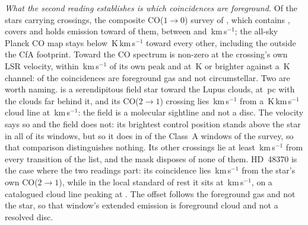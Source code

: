 \emph{What the second reading establishes is which coincidences are
foreground.} Of the \LsNLos{} stars carrying crossings, the composite
CO($1\to0$) survey of \citet{DameThaddeus2022}, which contains
\citet{Dame2001}, covers \LsNLosCov{} and holds emission toward \LsNLosDet{}
of them, between \LsCoVLo{} and \LsCoVHi\,km\,s$^{-1}$; the all-sky Planck CO
map \citep{PlanckCO2016} stays below \LsPlanckMax\,K\,km\,s$^{-1}$ toward
every other, including the \LsNLosOut{} outside the CfA footprint. Toward
\LsCloudStars{} the CO spectrum is non-zero at the crossing's own LSR
velocity, within \LsCloudDvMax\,km\,s$^{-1}$ of its own peak and at
\LsCloudTMin\,K or brighter against a \LsCoRms\,K channel: \LsNCloud{} of the
\MkNCoinc{} coincidences are foreground gas and not circumstellar.
Two are worth naming. \BkAlmaName{} is a serendipitous field star toward the
Lupus clouds, at \BkAlmaDistPc\,pc with the clouds far behind it, and its
CO($2\to1$) crossing lies \LsLupDv\,km\,s$^{-1}$ from a
\LsLupWco\,K\,km\,s$^{-1}$ cloud line at \LsLupVco\,km\,s$^{-1}$: the field
is a molecular sightline and not a disc. The velocity says so and the field
does not: its brightest control position stands above the star in all
\LsLupNRingLeadWord{} of its windows, but so it does in \LsRingLeadA{} of the
\NWinA{} Class~A windows of the survey, so that comparison
distinguishes nothing. Its other
\LsLupNFar{} crossings lie at least \LsLupFarMin\,km\,s$^{-1}$ from every
transition of the list, and the mask disposes of none of them. HD~48370 is
the case where the two readings part: its coincidence lies
\LsHdDvStar\,km\,s$^{-1}$ from the star's own CO($2\to1$), while in the local
standard of rest it sits at \LsHdVfeat\,km\,s$^{-1}$, on a catalogued cloud
line peaking at \LsHdVco. The offset follows the foreground gas and not the
star, so that window's extended emission is foreground cloud and not a
resolved disc.


\begin{table}
\centering
\footnotesize
\caption{The line mask, by species: the number of transitions $N$ it holds,
the frequency range they span inside the searched intervals and their
upper-state energies. Hydrogen recombination lines carry no tabulated
$E_{\rm u}$. The criterion and the dated query above define the list
exactly, so the individual transitions can be recovered from the line
catalogues themselves.}
\label{tab:masklines}

\end{table}

